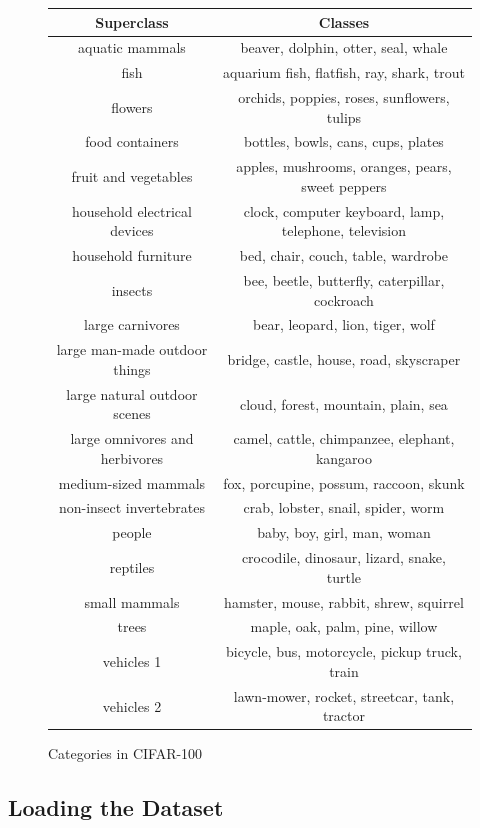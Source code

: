 \begin{figure}
  \begin{tabular} {c c} 
\hline
Superclass &	Classes\\
\hline
aquatic mammals & 	beaver, dolphin, otter, seal, whale\\
fish & 	aquarium fish, flatfish, ray, shark, trout\\
flowers & 	orchids, poppies, roses, sunflowers, tulips\\
food containers &	bottles, bowls, cans, cups, plates\\
fruit and vegetables &	apples, mushrooms, oranges, pears, sweet peppers\\
household electrical devices &	clock, computer keyboard, lamp, telephone, television\\
household furniture &	bed, chair, couch, table, wardrobe\\
insects &	bee, beetle, butterfly, caterpillar, cockroach\\
large carnivores &	bear, leopard, lion, tiger, wolf\\
large man-made outdoor things &	bridge, castle, house, road, skyscraper\\
large natural outdoor scenes &	cloud, forest, mountain, plain, sea\\
large omnivores and herbivores &	camel, cattle, chimpanzee, elephant, kangaroo\\
medium-sized mammals &	fox, porcupine, possum, raccoon, skunk\\
non-insect invertebrates &	crab, lobster, snail, spider, worm\\
people &	baby, boy, girl, man, woman\\
reptiles &	crocodile, dinosaur, lizard, snake, turtle\\
small mammals &	hamster, mouse, rabbit, shrew, squirrel\\
trees &	maple, oak, palm, pine, willow\\
vehicles 1 &	bicycle, bus, motorcycle, pickup truck, train\\
vehicles 2 &	lawn-mower, rocket, streetcar, tank, tractor\\
\end{tabular}
  \caption{Categories in CIFAR-100}
  \label{TabCIF100}

\end{figure}

\subsection{Loading the Dataset}


